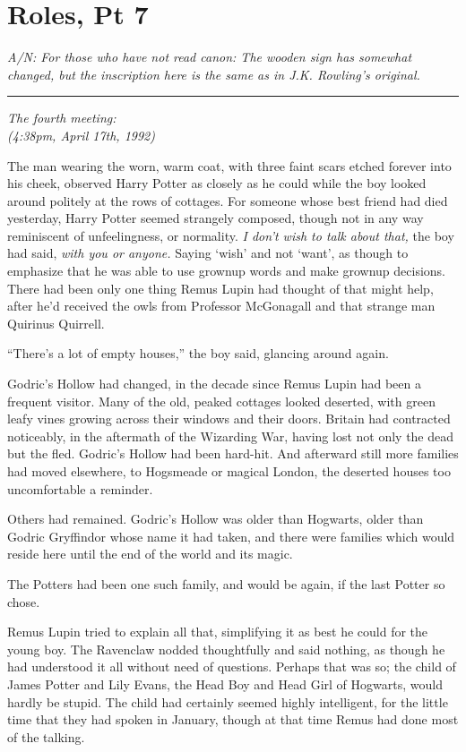 \chapter{Roles, Pt 7}

\emph{A/N: For those who have not read canon: The wooden sign has
somewhat changed, but the inscription here is the same as in J.K.
Rowling's original.}

\begin{center}\rule{3in}{0.4pt}\end{center}

\emph{The fourth meeting:\\ (4:38pm, April 17th, 1992)}

The man wearing the worn, warm coat, with three faint scars etched
forever into his cheek, observed Harry Potter as closely as he could
while the boy looked around politely at the rows of cottages. For
someone whose best friend had died yesterday, Harry Potter seemed
strangely composed, though not in any way reminiscent of unfeelingness,
or normality. \emph{I don't wish to talk about that,} the boy had said,
\emph{with you or anyone.} Saying `wish' and not `want', as though to
emphasize that he was able to use grownup words and make grownup
decisions. There had been only one thing Remus Lupin had thought of that
might help, after he'd received the owls from Professor McGonagall and
that strange man Quirinus Quirrell.

``There's a lot of empty houses,'' the boy said, glancing around again.

Godric's Hollow had changed, in the decade since Remus Lupin had been a
frequent visitor. Many of the old, peaked cottages looked deserted, with
green leafy vines growing across their windows and their doors. Britain
had contracted noticeably, in the aftermath of the Wizarding War, having
lost not only the dead but the fled. Godric's Hollow had been hard-hit.
And afterward still more families had moved elsewhere, to Hogsmeade or
magical London, the deserted houses too uncomfortable a reminder.

Others had remained. Godric's Hollow was older than Hogwarts, older than
Godric Gryffindor whose name it had taken, and there were families which
would reside here until the end of the world and its magic.

The Potters had been one such family, and would be again, if the last
Potter so chose.

Remus Lupin tried to explain all that, simplifying it as best he could
for the young boy. The Ravenclaw nodded thoughtfully and said nothing,
as though he had understood it all without need of questions. Perhaps
that was so; the child of James Potter and Lily Evans, the Head Boy and
Head Girl of Hogwarts, would hardly be stupid. The child had certainly
seemed highly intelligent, for the little time that they had spoken in
January, though at that time Remus had done most of the talking.

